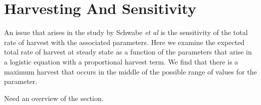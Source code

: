 
\section{Harvesting And Sensitivity}

An issue that arises in the study by Schwabe \textit{et al} is the
sensitivity of the total rate of harvest with the associated
parameters. Here we examine the expected total rate of harvest at
steady state as a function of the parameters that arise in a logistic
equation with a proportional harvest term. We find that there is a
maximum harvest that occurs in the middle of the possible range of
values for the parameter.

Need an overview of the section.



